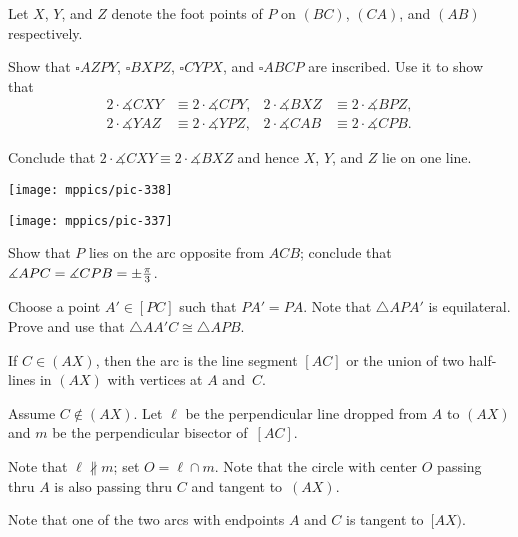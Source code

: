 Let $X$, $Y$, and $Z$ denote the foot points of $P$ on $(BC)$, $(CA)$, and $(AB)$ respectively.

Show that $\square AZPY$, $\square BXPZ$, $\square CYPX$, and $\square ABCP$ are inscribed.
Use it to show that
\begin{align*}
2\cdot \measuredangle CXY&\equiv 2\cdot \measuredangle CPY,
&
2\cdot \measuredangle BXZ&\equiv 2\cdot \measuredangle BPZ,
\\
2\cdot \measuredangle YAZ&\equiv 2\cdot \measuredangle YPZ,
&
2\cdot \measuredangle CAB&\equiv 2\cdot \measuredangle CPB.
\end{align*}

Conclude that 
$2\cdot \measuredangle CXY\equiv 2\cdot \measuredangle BXZ$
and hence $X$, $Y$, and $Z$ lie on one line.

\medskip

\begin{minipage}{.48\textwidth}
\centering
\texttt{[image: mppics/pic-338]}
\end{minipage}
\hfill
\begin{minipage}{.48\textwidth}
\centering
\texttt{[image: mppics/pic-337]}
\end{minipage}

\medskip


Show that $P$ lies on the arc opposite from $ACB$;
conclude that
$\measuredangle APC\z=\measuredangle CPB\z=\pm\tfrac\pi3$.

Choose a point $A'\in [PC]$ such that $PA'=PA$.
Note that $\triangle APA'$ is equilateral.
Prove and use that $\triangle AA'C\cong \triangle APB$.

If $C\in (AX)$, then the arc is the line segment $[AC]$ or the union of two half-lines in $(AX)$ with vertices at $A$ and~$C$.

Assume $C\notin (AX)$.
Let $\ell$ be the perpendicular line dropped from $A$ to $(AX)$ and $m$ be the perpendicular bisector of~$[AC]$.

Note that $\ell\nparallel m$;
set $O=\ell\cap m$.
Note that the circle with center $O$ passing thru $A$ is also passing thru $C$ and tangent to~$(AX)$.


Note that one of the two arcs with endpoints $A$ and $C$ is tangent to~$[AX)$.

